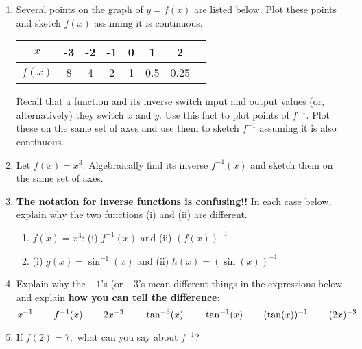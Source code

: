 \documentclass[11pt,fleqn]{article}
\begin{document}
 \begin{enumerate}
 \item Several points on the graph of $y=f(x)$ are listed below. Plot these points and sketch $f(x)$ assuming it is continuous.
 
 \begin{tabular}{c || c| c|c|c|c|c|c}
 $x$ &-3& -2&-1&0&1&2\\
 \hline
 $f(x)$ &8& 4&2&1&0.5&0.25 \\
 \end{tabular}
 \vfill
 
Recall that a function and its inverse switch input and output values (or, alternatively) they switch $x$ and $y.$ Use this fact to plot points of $f^{-1}.$ Plot these on the same set of axes and use them to sketch $f^{-1}$ assuming it is also continuous.

\item Let $f(x)=x^3$. Algebraically find its inverse $f^{-1}(x)$ and sketch them on the same set of axes.
\vfill

\item \textbf{The notation for inverse functions is confusing!!} In each case below, explain why the two functions (i) and (ii) are different.
	\begin{enumerate}
	\item $f(x)=x^3$: (i) $f^{-1}(x)$ and (ii) $(f(x))^{-1}$
	\vspace{.5in}
 	\item (i) $g(x)=\sin^{-1}(x)$ and (ii) $h(x)=(\sin (x))^{-1}$
	\vspace{.5in}
 	\end{enumerate}
\newpage
\item Explain why the $-1$'s (or $-3$'s mean different things in the expressions below and explain \textbf{how you can tell the difference}:\\
$$ x^{-1} \hspace{.3in}  f^{-1}(x) \hspace{.3in} 2x^{-3} \hspace{.3in}  \tan^{-3}(x) \hspace{.3in}  \tan^{-1}(x) \hspace{.3in}  (\tan(x))^{-1} \hspace{.3in} (2x)^{-3}$$
\vspace{1in}

\item If $f(2)=7,$ what can you say about $f^{-1}$?
\vspace{0.5in}


\end{enumerate}
\end{document}
